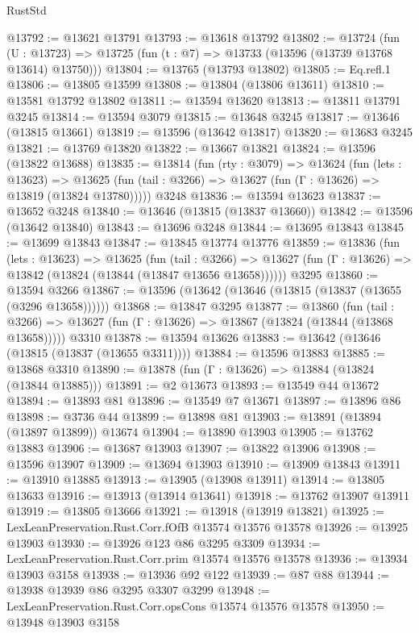 \begin{lexlean}{RustStd}
\begin{coremodule}
{\begin{coremodule}
{{{{{{{{{{{{{{{{{{{{{{{{{{{{{{{{{{{{{{{@13792 := @13621 @13791
@13793 := @13618 @13792
@13802 := @13724
    (fun (U : @13723) => @13725 (fun (t : @7) => @13733 (@13596 (@13739 @13768 @13614) @13750)))
@13804 := @13765 (@13793 @13802)
@13805 := Eq.refl.{1}
@13806 := @13805 @13599
@13808 := @13804 (@13806 @13611)
@13810 := @13581 @13792 @13802
@13811 := @13594 @13620
@13813 := @13811 @13791 @3245
@13814 := @13594 @3079
@13815 := @13648 @3245
@13817 := @13646 (@13815 @13661)
@13819 := @13596 (@13642 @13817)
@13820 := @13683 @3245
@13821 := @13769 @13820
@13822 := @13667 @13821
@13824 := @13596 (@13822 @13688)
@13835 := @13814
    (fun (rty : @3079) =>
    @13624
      (fun (lets : @13623) =>
      @13625 (fun (tail : @3266) => @13627 (fun (Γ : @13626) => @13819 (@13824 @13780)))))
    @3248
@13836 := @13594 @13623
@13837 := @13652 @3248
@13840 := @13646 (@13815 (@13837 @13660))
@13842 := @13596 (@13642 @13840)
@13843 := @13696 @3248
@13844 := @13695 @13843
@13845 := @13699 @13843
@13847 := @13845 @13774 @13776
@13859 := @13836
    (fun (lets : @13623) =>
    @13625
      (fun (tail : @3266) =>
      @13627 (fun (Γ : @13626) => @13842 (@13824 (@13844 (@13847 @13656 @13658))))))
    @3295
@13860 := @13594 @3266
@13867 := @13596 (@13642 (@13646 (@13815 (@13837 (@13655 (@3296 @13658))))))
@13868 := @13847 @3295
@13877 := @13860
    (fun (tail : @3266) => @13627 (fun (Γ : @13626) => @13867 (@13824 (@13844 (@13868 @13658)))))
    @3310
@13878 := @13594 @13626
@13883 := @13642 (@13646 (@13815 (@13837 (@13655 @3311))))
@13884 := @13596 @13883
@13885 := @13868 @3310
@13890 := @13878 (fun (Γ : @13626) => @13884 (@13824 (@13844 @13885)))
@13891 := @2 @13673
@13893 := @13549 @44 @13672
@13894 := @13893 @81
@13896 := @13549 @7 @13671
@13897 := @13896 @86
@13898 := @3736 @44
@13899 := @13898 @81
@13903 := @13891 (@13894 (@13897 @13899)) @13674
@13904 := @13890 @13903
@13905 := @13762 @13883
@13906 := @13687 @13903
@13907 := @13822 @13906
@13908 := @13596 @13907
@13909 := @13694 @13903
@13910 := @13909 @13843
@13911 := @13910 @13885
@13913 := @13905 (@13908 @13911)
@13914 := @13805 @13633
@13916 := @13913 (@13914 @13641)
@13918 := @13762 @13907 @13911
@13919 := @13805 @13666
@13921 := @13918 (@13919 @13821)
@13925 := LexLeanPreservation.Rust.Corr.fOfB @13574 @13576 @13578
@13926 := @13925 @13903
@13930 := @13926 @123 @86 @3295 @3309
@13934 := LexLeanPreservation.Rust.Corr.prim @13574 @13576 @13578
@13936 := @13934 @13903 @3158
@13938 := @13936 @92 @122
@13939 := @87 @88
@13944 := @13938 @13939 @86 @3295 @3307 @3299
@13948 := LexLeanPreservation.Rust.Corr.opsCons @13574 @13576 @13578
@13950 := @13948 @13903 @3158
}}}}}}}}}}}}}}}}}}}}}}}}}}}}}}}}}}}}}}}
\end{coremodule}}
\end{coremodule}
\end{lexlean}
